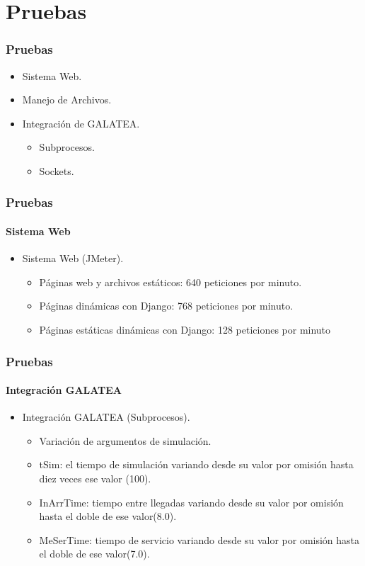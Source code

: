 \documentclass[spanish,xcolor=dvipsnames]{beamer}
\begin{document}
    \section{Pruebas}
    \begin{frame}
        \frametitle{Pruebas}
        
        \begin{itemize}
        	\item Sistema Web.
        	\item Manejo de Archivos.
        	\item Integración de GALATEA.
        	\begin{itemize}
        		\item Subprocesos.
        		\item Sockets.
        	\end{itemize}
        \end{itemize}
    \end{frame}
    \begin{frame}
    	\frametitle{Pruebas}
    	\framesubtitle{Sistema Web}
    	
    	\begin{itemize}
    		\item Sistema Web (JMeter).
    		\begin{itemize}
    			\item Páginas web y archivos estáticos: 640 peticiones por minuto.
    			\item Páginas dinámicas con Django: 768 peticiones por minuto.
    			\item Páginas estáticas dinámicas con Django: 128 peticiones por minuto
    		\end{itemize}
    	\end{itemize}
    \end{frame}
    \begin{frame}
    	\frametitle{Pruebas}
    	\framesubtitle{Integración GALATEA}
    	
    	\begin{itemize}
    		\item Integración GALATEA (Subprocesos).
    		\begin{itemize}
    			\item Variación de argumentos de simulación.
    			\item tSim: el tiempo de simulación variando desde su valor por omisión hasta diez veces ese valor (100).
    			\item InArrTime: tiempo entre llegadas variando desde su valor por omisión hasta el doble de ese valor(8.0).
    			\item MeSerTime: tiempo de servicio variando desde su valor por omisión hasta el doble de ese valor(7.0).
    		\end{itemize}
    	\end{itemize}
    \end{frame}
\end{document}
